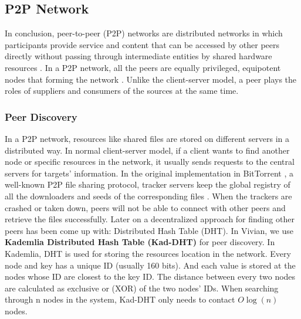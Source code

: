\subsection{P2P Network}

In conclusion, peer-to-peer (P2P) networks are distributed networks in which participants provide service and content that can be accessed by other peers directly without passing through intermediate entities by shared hardware resources \cite{990434}.
In a P2P network, all the peers are equally privileged, equipotent nodes that forming the network \cite{nemat2011taking}. Unlike the client-server model, a peer plays the roles of suppliers and consumers of the sources at the same time.

\subsubsection{Peer Discovery}
In a P2P network, resources like shared files are stored on different servers in a distributed way.
In normal client-server model, if a client wants to find another node or specific resources in the network, it usually sends requests to the central servers for targets' information.
In the original implementation in BitTorrent \cite{bram_2008}, a well-known P2P file sharing protocol, tracker servers keep the global registry of all the downloaders and seeds of the corresponding files \cite{pouwelse2005bittorrent}.
When the trackers are crashed or taken down, peers will not be able to connect with other peers and retrieve the files successfully. Later on a decentralized approach for finding other peers has been come up with: Distributed Hash Table (DHT).
In Vivian, we use \textbf{Kademlia Distributed Hash Table (Kad-DHT)} \cite{maymounkov2002kademlia} for peer discovery. In Kademlia, DHT is used for storing the resources location in the network. Every node and key has a unique ID (usually 160 bits).
And each value is stored at the nodes whose ID are closest to the key ID. The distance between every two nodes are calculated as exclusive or (XOR) of the two nodes' IDs.
When searching through n nodes in the system, Kad-DHT only needs to contact $O\log (n)$ nodes.

